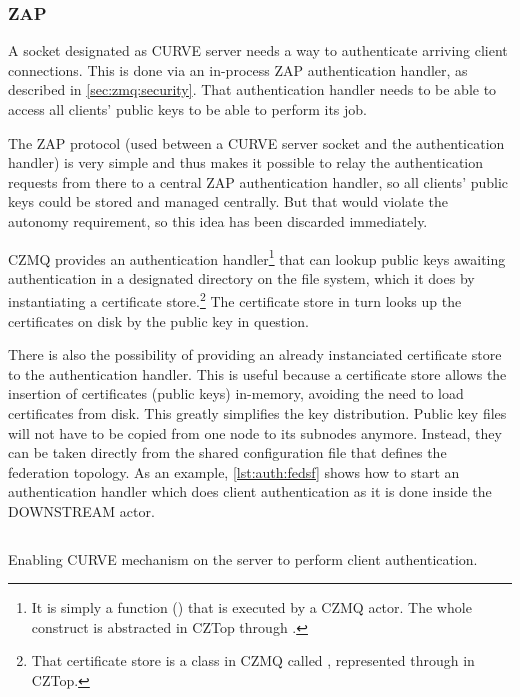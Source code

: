 \subsubsection{ZAP}
A socket designated as CURVE server needs a way to authenticate arriving client
connections. This is done via an in-process \gls{ZAP} authentication handler,
as described in \autoref{sec:zmq:security}. That authentication handler
needs to be able to access all clients' public keys to be able to perform its
job.

The ZAP protocol (used between a CURVE server socket and the authentication
handler) is very simple and thus makes it possible to relay the authentication
requests from there to a central ZAP authentication handler, so all clients'
public keys could be stored and managed centrally. But that would violate the
autonomy requirement, so this idea has been discarded immediately.

CZMQ provides an authentication handler\footnote{It is simply a function
() that is executed by a CZMQ actor. The whole construct is
abstracted in CZTop through .} that can lookup public
keys awaiting authentication in a designated directory on the file system,
which it does by instantiating a certificate store.\footnote{That certificate
store is a class in CZMQ called , represented through
 in CZTop.} The certificate store in turn looks up the
certificates on disk by the public key in question.

There is also the possibility of providing an already instanciated certificate
store to the authentication handler. This is useful because a certificate store
allows the insertion of certificates (public keys) in-memory, avoiding the need
to load certificates from disk. This greatly simplifies the key distribution.
Public key files will not have to be copied from one node to its subnodes
anymore. Instead, they can be taken directly from the shared configuration file
that defines the federation topology. As an example, \autoref{lst:auth:fedsf}
shows how to start an authentication handler which does client authentication
as it is done inside the DOWNSTREAM actor.

\begin{listing}
	\inputminted[bgcolor=bg]{Ruby}{listings/auth/fedsf.rb}
	\caption{Enabling CURVE mechanism on the server to perform client authentication.}
	\label{lst:auth:fedsf}
\end{listing}

